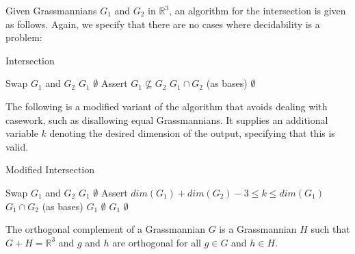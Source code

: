 \documentclass[12pt]{article}
\newcommand{\R}{\mathbb{R}}
\newenvironment{definition}[2][Definition]{\begin{trivlist}
\item[\hskip \labelsep {\bfseries #1}\hskip \labelsep {\bfseries #2.}]}{\end{trivlist}}
\newenvironment{proposition}[2][Proposition]{\begin{trivlist}
\item[\hskip \labelsep {\bfseries #1}\hskip \labelsep {\bfseries #2.}]}{\end{trivlist}}
\begin{document}
\begin{proposition}{3.2}
Given Grassmannians \(G_1\) and \(G_2\) in \(\R^3\), an algorithm for the intersection is given as follows. Again, we specify that there are no cases where decidability is a problem:

\begin{algorithm}[H]
\caption{Intersection}
\begin{algorithmic}[3]
\State Swap $G_1$ and $G_2$
\EndIf
{}
\Return $G_1$
\Return $\emptyset$
\EndIf
\State Assert $G_1 \not\subseteq G_2$
\Return $G_1 \cap G_2$ (as bases)
\Return $\emptyset$
\Else{
\Return $\emptyset$
}
\EndIf
\EndProcedure
\end{algorithmic}
\end{algorithm}

\end{proposition}

\begin{proposition}{3.3}
The following is a modified variant of the algorithm that avoids dealing with casework, such as disallowing equal Grassmannians. It supplies an additional variable \(k\) denoting the desired dimension of the output, specifying that this is valid.

\begin{algorithm}[H]
\caption{Modified Intersection}
\begin{algorithmic}[4]
\State Swap $G_1$ and $G_2$
\EndIf
{}
\Return $G_1$
\Return $\emptyset$
\EndIf
\State Assert $dim(G_1) + dim(G_2) - 3 \leq k \leq dim(G_1)$
\Return $G_1 \cap G_2$ (as bases)
\Return $G_1$
\Return $\emptyset$
\Return $G_1$
\Return $\emptyset$
\EndIf
\EndProcedure
\end{algorithmic}
\end{algorithm}

\end{proposition}

\begin{definition}{4.1}
The orthogonal complement of a Grassmannian \(G\) is a Grassmannian \(H\) such that \(G + H = \R^3\) and \(g\) and \(h\) are orthogonal for all \(g \in G\) and \(h \in H\).
\end{definition}
\end{document}
